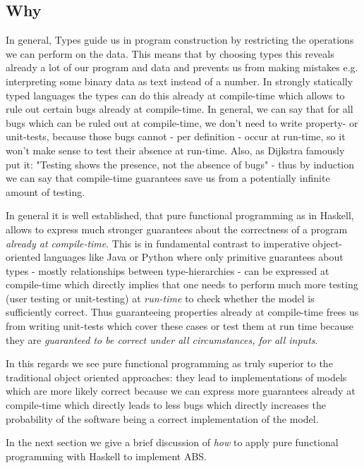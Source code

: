 \subsection{Why}
In general, Types guide us in program construction by restricting the operations we can perform on the data. This means that by choosing types this reveals already a lot of our program and data and prevents us from making mistakes e.g. interpreting some binary data as text instead of a number. In strongly statically typed languages the types can do this already at compile-time which allows to rule out certain bugs already at compile-time. In general, we can say that for all bugs which can be ruled out at compile-time, we don't need to write property- or unit-tests, because those bugs cannot - per definition - occur at run-time, so it won't make sense to test their absence at run-time. Also, as Dijkstra famously put it: "Testing shows the presence, not the absence of bugs" - thus by induction we can say that compile-time guarantees save us from a potentially infinite amount of testing.

In general it is well established, that pure functional programming as in Haskell, allows to express much stronger guarantees about the correctness of a program \textit{already at compile-time}. This is in fundamental contrast to imperative object-oriented languages like Java or Python where only primitive guarantees about types - mostly relationships between type-hierarchies - can be expressed at compile-time which directly implies that one needs to perform much more testing (user testing or unit-testing) at \textit{run-time} to check whether the model is sufficiently correct. Thus guaranteeing properties already at compile-time frees us from writing unit-tests which cover these cases or test them at run time because they are \textit{guaranteed to be correct under all circumstances, for all inputs}.

In this regards we see pure functional programming as truly superior to the traditional object oriented approaches: they lead to implementations of models which are more likely correct because we can express more guarantees already at compile-time which directly leads to less bugs which directly increases the probability of the software being a correct implementation of the model.

In the next section we give a brief discussion of \textit{how} to apply pure functional programming with Haskell to implement ABS.